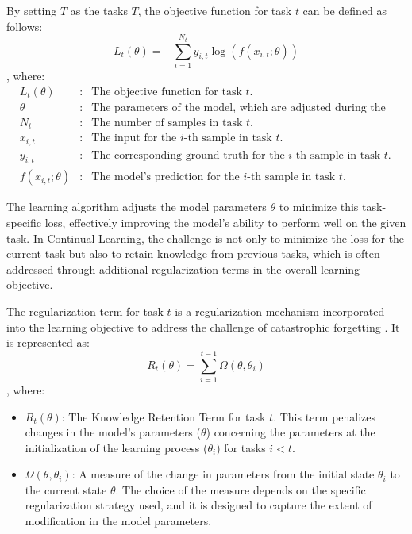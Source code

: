 \documentclass[12pt,a4paper]{article}
\begin{document}
By setting $T$ as the tasks $T$, the objective function for task $t$ can be defined as follows:
\begin{equation}
	L_t(\theta) = - \sum_{i=1}^{N_t} y_{i,t} \log(f(x_{i,t};\theta))
\end{equation}
, where:
\begin{align*}
	&L_t(\theta) &:& \text{The objective function for task } t. \\
	&\theta      &:& \text{The parameters of the model, which are adjusted during the learning process.} \\
	&N_t         &:& \text{The number of samples in task } t. \\
	&x_{i,t}     &:& \text{The input for the } i\text{-th sample in task } t. \\
	&y_{i,t}     &:& \text{The corresponding ground truth for the } i\text{-th sample in task } t. \\
	&f(x_{i,t};\theta) &:& \text{The model's prediction for the } i\text{-th sample in task } t.
\end{align*}

The learning algorithm adjusts the model parameters $\theta$ to minimize this task-specific loss, effectively improving the model's ability to perform well on the given task. In Continual Learning, the challenge is not only to minimize the loss for the current task but also to retain knowledge from previous tasks, which is often addressed through additional regularization terms in the overall learning objective.


The regularization term for task \(t\) is a regularization mechanism incorporated into the learning objective to address the challenge of catastrophic forgetting \cite{cont-regular}. It is represented as:
\begin{equation}
	R_t(\theta) = \sum_{i=1}^{t-1} \Omega(\theta, \theta_i)
\end{equation}
, where:
\begin{itemize}
	\item $R_t(\theta)$: The Knowledge Retention Term for task $t$. This term penalizes changes in the model's parameters ($\theta$) concerning the parameters at the initialization of the learning process ($\theta_i$) for tasks $i < t$.
	
	\item $\Omega(\theta, \theta_i)$: A measure of the change in parameters from the initial state $\theta_i$ to the current state $\theta$. The choice of the measure depends on the specific regularization strategy used, and it is designed to capture the extent of modification in the model parameters.
\end{itemize}
\end{document}
